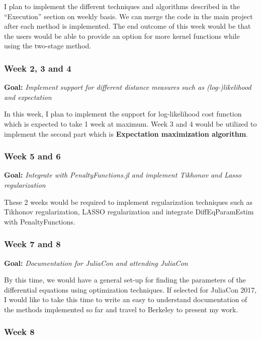 \documentclass[11pt]{article}
\begin{document}
I plan to implement the different techniques and algorithms described in
the ``Execution'' section on weekly basis. We can merge the code in the
main project after each method is implemented. The end outcome of this
week would be that the users would be able to provide an option for more
kernel functions while using the two-stage method.

    \subsubsection{Week 2, 3 and 4}\label{week-2-3-and-4}

\textbf{Goal:} \emph{Implement support for different distance measures
such as (log-)likelihood and expectation }

In this week, I plan to implement the support for log-likelihood cost
function which is expected to take 1 week at maximum. Week 3 and 4 would
be utilized to implement the second part which is \textbf{Expectation
maximization algorithm}.

    \subsubsection{Week 5 and 6}\label{week-5-and-6}

\textbf{Goal:} \emph{Integrate with PenaltyFunctions.jl and implement
Tikhonov and Lasso regularization}

These 2 weeks would be required to implement regularization techniques
such as Tikhonov regularization, LASSO regularization and integrate
DiffEqParamEstim with PenaltyFunctions.

    \subsubsection{Week 7 and 8}\label{week-7-and-8}

\textbf{Goal:} \emph{Documentation for JuliaCon and attending JuliaCon}

By this time, we would have a general set-up for finding the parameters
of the differential equations using optimization techniques. If selected
for JuliaCon 2017, I would like to take this time to write an easy to
understand documentation of the methods implemented so far and travel to
Berkeley to present my work.

    \subsubsection{Week 8}\label{week-8}
\end{document}
